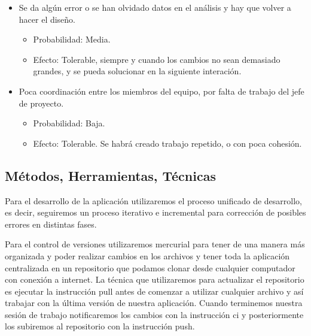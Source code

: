 \begin{itemize}
\item Se da algún error o se han olvidado datos en el análisis y hay que volver a hacer el diseño.

\begin{itemize}
\item Probabilidad: Media.

\item Efecto: Tolerable, siempre y cuando los cambios no sean demasiado grandes, y se pueda solucionar en la siguiente interación.

\end{itemize}


\item Poca coordinación entre los miembros del equipo, por falta de trabajo del jefe de proyecto.

\begin{itemize}
\item Probabilidad: Baja.

\item Efecto: Tolerable. Se habrá creado trabajo repetido, o con poca cohesión.

\end{itemize}


\end{itemize}

\subsection{Métodos,  Herramientas,  Técnicas}
Para el desarrollo de la aplicación utilizaremos el proceso unificado de desarrollo, es decir, seguiremos un proceso iterativo e incremental para corrección de posibles errores en distintas fases.

Para el control de versiones utilizaremos mercurial para tener de una manera más organizada y poder realizar cambios en los archivos y tener toda la aplicación centralizada en un repositorio que podamos clonar desde cualquier computador con conexión a internet. La técnica que utilizaremos para actualizar el repositorio es ejecutar la instrucción pull antes de comenzar a utilizar cualquier archivo y así trabajar con la última versión de nuestra aplicación. Cuando terminemos nuestra sesión de trabajo notificaremos los cambios con la instrucción ci y posteriormente los subiremos al repositorio con la instrucción push.

